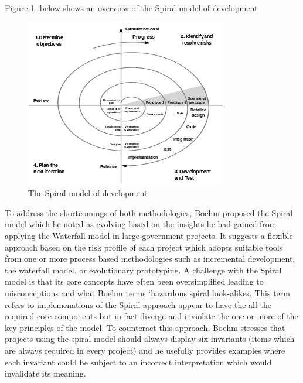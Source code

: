 \documentclass[a4paper,12pt]{article}
\begin{document}
\begin{samepage}
Figure 1. below shows an overview of the Spiral model of development

 \begin{figure}[h!]
  \includegraphics{spiralmodel.png}
  \caption{The Spiral model of development}
  \label{fig:spiral_model}
\end{figure}

To address the shortcomings of both methodologies, Boehm proposed the Spiral model which he noted as evolving based on the insights he had gained from applying the Waterfall model in large government projects.
It suggests a flexible approach based on the risk profile of each project which adopts suitable tools from one or more process based methodologies such as incremental development, the waterfall model, or evolutionary prototyping. A challenge with the Spiral model is that its core concepts have often been oversimplified leading to misconceptions and what Boehm terms `hazardous spiral look-alikes. This term refers to implemenations of the Spiral approach appear to have the all the required core components but in fact diverge and inviolate the one or more of the key principles of the model. To counteract this approach, Boehm stresses that projects using the spiral model should always display six invariants (items which are always required in every project) and he usefully provides examples where each invariant could be subject to an incorrect interpretation which would invalidate its meaning.

\begin{itemize}


\end{itemize}
\end{samepage}
\end{document}
